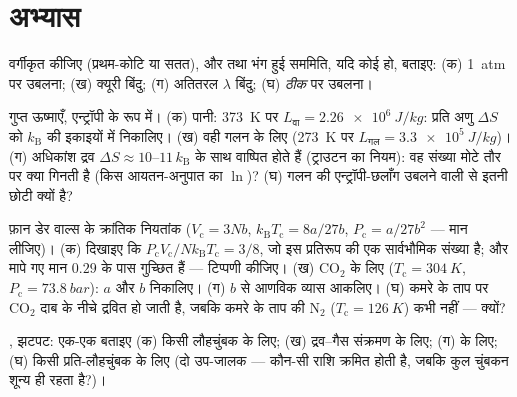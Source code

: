\section{अभ्यास}

\begin{exercise}[$\star$]\label{exo:b3:phase-transitions:1}
वर्गीकृत कीजिए (प्रथम-कोटि या सतत), और  तथा भंग हुई
सममिति, यदि कोई हो, बताइए: (क) \qty{1}{atm} पर उबलना; (ख)
क्यूरी बिंदु; (ग) अतितरल $\lambda$ बिंदु; (घ) \emph{ठीक}  पर उबलना।
\end{exercise}

\begin{exercise}[$\star$]\label{exo:b3:phase-transitions:2}
गुप्त ऊष्माएँ, एन्ट्रॉपी के रूप में। (क) पानी: \qty{373}{K} पर
$L_{\text{वा}} =
\qty{2.26e6}{J/kg}$: प्रति अणु $\Delta S$ को
$k_{\text{B}}$ की इकाइयों में निकालिए। (ख) वही गलन के लिए
(\qty{273}{K} पर $L_{\text{गल}} = \qty{3.3e5}{J/kg}$)। (ग) अधिकांश
द्रव $\Delta S \approx 10$--$11\,k_{\text{B}}$ के साथ वाष्पित होते
हैं (ट्राउटन का नियम): वह संख्या मोटे तौर पर क्या गिनती है (किस
आयतन-अनुपात का $\ln$)? (घ) गलन की एन्ट्रॉपी-छलाँग उबलने वाली से
इतनी छोटी क्यों है?
\end{exercise}

\begin{exercise}[$\star$]\label{exo:b3:phase-transitions:3}
फ़ान डेर वाल्स के क्रांतिक नियतांक ($V_{\text{c}} = 3Nb$,
$k_{\text{B}}T_{\text{c}} = 8a/27b$, $P_{\text{c}} = a/27b^2$ ---
मान लीजिए)। (क) दिखाइए कि $P_{\text{c}}V_{\text{c}}/Nk_{\text{B}}T_{\text{
c}} = 3/8$, जो इस प्रतिरूप की एक सार्वभौमिक संख्या है; और मापे गए
मान $0.29$ के पास गुच्छित हैं --- टिप्पणी कीजिए। (ख) CO$_2$ के लिए
($T_{\text{c}} = \qty{304}{K}$, $P_{\text{c}} = \qty{73.8}{bar}$):
$a$ और $b$ निकालिए। (ग) $b$ से आणविक व्यास
आकलिए। (घ) कमरे के ताप पर CO$_2$ दाब के नीचे द्रवित हो जाती है,
जबकि कमरे के ताप की N$_2$ ($T_{\text{c}} =
\qty{126}{K}$) कभी नहीं --- क्यों?
\end{exercise}

\begin{exercise}[$\star$]\label{exo:b3:phase-transitions:4}
, झटपट: एक-एक बताइए (क) किसी लौहचुंबक के लिए; (ख)
द्रव--गैस संक्रमण के लिए; (ग)  के लिए; (घ)
किसी प्रति-लौहचुंबक के लिए (दो उप-जालक --- कौन-सी राशि क्रमित होती
है, जबकि कुल चुंबकन शून्य ही रहता है?)।
\end{exercise}

